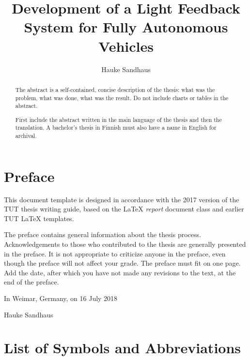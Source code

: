 \documentclass[twoside]{tutthesis} %
\author{Hauke Sandhaus}
\title{Development of a Light Feedback System for Fully Autonomous Vehicles}
\begin{document}
\maketitle



\begin{abstract}
The abstract is a self-contained, concise description of the thesis: what was the problem, what was done, what was the result.
Do not include charts or tables in the abstract.

First include the abstract written in the main language of the thesis and then the translation.
A bachelor's thesis in Finnish must also have a name in English for archival.
\end{abstract}


\chapter*{Preface}

This document template is designed in accordance with the 2017 version of the TUT thesis writing guide, based on the LaTeX \emph{report} document class and earlier TUT LaTeX templates.

The preface contains general information about the thesis process.
Acknowledgements to those who contributed to the thesis are generally presented in the preface.
It is not appropriate to criticize anyone in the preface, even though the preface will not affect your grade.
The preface must fit on one page.
Add the date, after which you have not made any revisions to the text, at the end of the preface.

\vspace{2\baselineskip}

In Weimar, Germany, on 16 July 2018

\vspace{2\baselineskip}

Hauke Sandhaus



\tableofcontents

\listoffigures



\chapter*{List of Symbols and Abbreviations}
\end{document}
